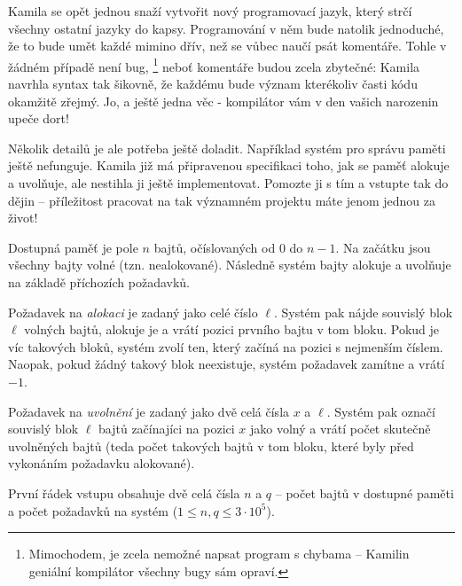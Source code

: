 





Kamila se opět jednou snaží vytvořit nový programovací jazyk, který strčí
všechny ostatní jazyky do kapsy. Programování v něm bude natolik jednoduché,
že to bude umět každé mimino dřív, než se vůbec naučí psát komentáře.
Tohle v žádném případě není bug,%
\footnote{Mimochodem, je zcela nemožné napsat program s chybama --
Kamilin geniální kompilátor všechny bugy sám opraví.}
neboť komentáře budou zcela zbytečné: Kamila navrhla syntax tak šikovně, že každému
bude význam kterékoliv časti kódu okamžitě zřejmý. Jo, a ještě jedna věc -
kompilátor vám v den vašich narozenin upeče dort!

Několik detailů je ale potřeba ještě doladit. Například systém pro správu
paměti ještě nefunguje. Kamila již má připravenou specifikaci toho, jak se
paměť alokuje a uvolňuje, ale nestihla ji ještě implementovat. Pomozte ji s tím
a vstupte tak do dějin -- příležitost pracovat na tak významném projektu máte
jenom jednou za život!



Dostupná paměť je pole $n$ bajtů, očíslovaných od $0$ do $n-1$.
Na začátku jsou všechny bajty volné (tzn. nealokované).
Následně systém bajty alokuje a uvolňuje na základě příchozích požadavků.

Požadavek na \emph{alokaci} je zadaný jako celé číslo $\ell$.
Systém pak nájde souvislý blok $\ell$ volných bajtů, alokuje je a vrátí pozici
prvního bajtu v tom bloku. Pokud je víc takových bloků, systém zvolí ten,
který začíná na pozici s nejmenším číslem. Naopak, pokud žádný takový blok
neexistuje, systém požadavek zamítne a vrátí $-1$.

Požadavek na \emph{uvolnění} je zadaný jako dvě celá čísla $x$ a $\ell$.
Systém pak označí souvislý blok $\ell$ bajtů začínajíci na pozici $x$ jako
volný a vrátí počet skutečně uvolněných bajtů (teda počet takových bajtů v
tom bloku, které byly před vykonáním požadavku alokované).



První řádek vstupu obsahuje dvě celá čísla $n$ a $q$ -- počet bajtů v dostupné
paměti a počet požadavků na systém ($1 \leq n, q \leq 3\cdot 10^5$).

